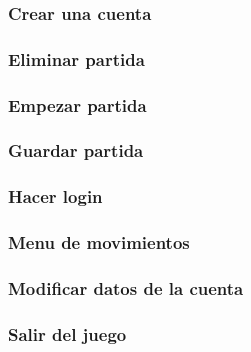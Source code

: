 \subsubsection{Crear una cuenta}
\subsubsection{Eliminar partida}
\subsubsection{Empezar partida}
\subsubsection{Guardar partida}
\subsubsection{Hacer login}
\subsubsection{Menu de movimientos}
\subsubsection{Modificar datos de la cuenta}
\subsubsection{Salir del juego}

